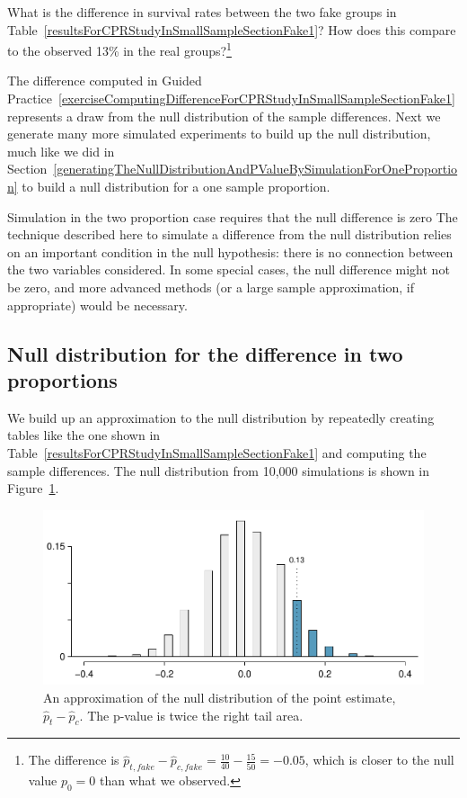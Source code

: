 \begin{exercise} \label{exerciseComputingDifferenceForCPRStudyInSmallSampleSectionFake1}
What is the difference in survival rates between the two fake groups in Table~\ref{resultsForCPRStudyInSmallSampleSectionFake1}? How does this compare to the observed 13\% in the real groups?\footnote{The difference is $\hat{p}_{t, fake} - \hat{p}_{c, fake} = \frac{10}{40} - \frac{15}{50} = -0.05$, which is closer to the null value $p_0=0$ than what we observed.}
\end{exercise}

The difference computed in Guided Practice~\ref{exerciseComputingDifferenceForCPRStudyInSmallSampleSectionFake1} represents a draw from the null distribution of the sample differences. Next we generate many more simulated experiments to build up the null distribution, much like we did in Section~\ref{generatingTheNullDistributionAndPValueBySimulationForOneProportion} to build a null distribution for a one sample proportion.

\begin{caution}{Simulation in the two proportion case requires that the null difference is zero}
{The technique described here to simulate a difference from the null distribution relies on an important condition in the null hypothesis: there is no connection between the two variables considered. In some special cases, the null difference might not be zero, and more advanced methods (or a large sample approximation, if appropriate) would be necessary.}
\end{caution}

\subsection{Null distribution for the difference in two proportions}

We build up an approximation to the null distribution by repeatedly creating tables like the one shown in Table~\ref{resultsForCPRStudyInSmallSampleSectionFake1} and computing the sample differences. The null distribution from 10,000 simulations is shown in Figure~\ref{pValueCPRStudySmallSampleAnalysisInSmallSampleSection}.
\begin{figure}
\centering
\includegraphics[width=\textwidth]{ch_inference_for_props/figures/pValueCPRStudySmallSampleAnalysisInSmallSampleSection/pValueCPRStudySmallSampleAnalysisInSmallSampleSection}
\caption{An approximation of the null distribution of the point estimate, $\hat{p}_t - \hat{p}_c$. The p-value is twice the right tail area.}
\label{pValueCPRStudySmallSampleAnalysisInSmallSampleSection}
\end{figure}

